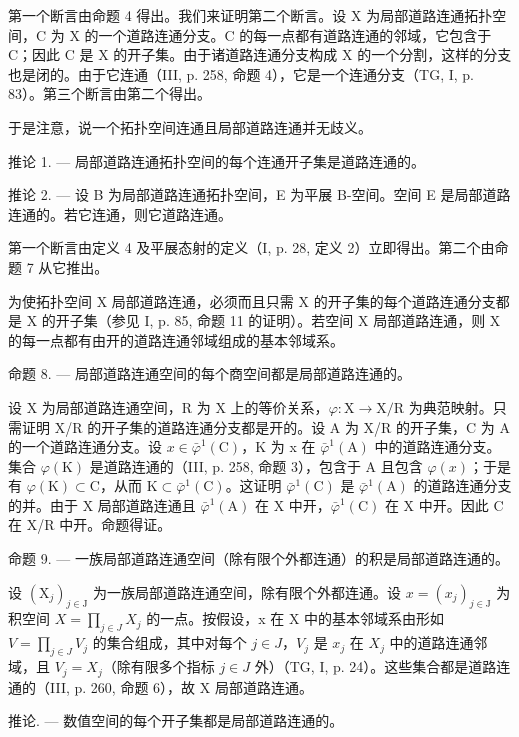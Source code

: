 第一个断言由命题 4 得出。我们来证明第二个断言。设 X 为局部道路连通拓扑空间，C 为 X 的一个道路连通分支。C 的每一点都有道路连通的邻域，它包含于 C；因此 C 是 X 的开子集。由于诸道路连通分支构成 X 的一个分割，这样的分支也是闭的。由于它连通（III, p. 258, 命题 4），它是一个连通分支（TG, I, p. 83）。第三个断言由第二个得出。

于是注意，说一个拓扑空间连通且局部道路连通并无歧义。

推论 1. --- 局部道路连通拓扑空间的每个连通开子集是道路连通的。

推论 2. --- 设 B 为局部道路连通拓扑空间，E 为平展 B-空间。空间 E 是局部道路连通的。若它连通，则它道路连通。

第一个断言由定义 4 及平展态射的定义（I, p. 28, 定义 2）立即得出。第二个由命题 7 从它推出。

为使拓扑空间 X 局部道路连通，必须而且只需 X 的开子集的每个道路连通分支都是 X 的开子集（参见 I, p. 85, 命题 11 的证明）。若空间 X 局部道路连通，则 X 的每一点都有由开的道路连通邻域组成的基本邻域系。

命题 8. --- 局部道路连通空间的每个商空间都是局部道路连通的。

设 X 为局部道路连通空间，R 为 X 上的等价关系，\(\varphi\colon\mathrm{X}\to\mathrm{X}/\mathrm{R}\) 为典范映射。只需证明 X/R 的开子集的道路连通分支都是开的。设 A 为 X/R 的开子集，C 为 A 的一个道路连通分支。设 \(x\in\bar{\varphi}^{1}(\mathrm{C})\)，K 为 x 在 \(\bar{\varphi}^{1}(\mathrm{A})\) 中的道路连通分支。集合 \(\varphi(\mathrm{K})\) 是道路连通的（III, p. 258, 命题 3），包含于 A 且包含 \(\varphi(x)\)；于是有 \(\varphi(\mathrm{K})\subset\mathrm{C}\)，从而 \(\mathrm{K}\subset\bar{\varphi}^{1}(\mathrm{C})\)。这证明 \(\bar{\varphi}^{1}(\mathrm{C})\) 是 \(\bar{\varphi}^{1}(\mathrm{A})\) 的道路连通分支的并。由于 X 局部道路连通且 \(\bar{\varphi}^{1}(\mathrm{A})\) 在 X 中开，\(\bar{\varphi}^{1}(\mathrm{C})\) 在 X 中开。因此 C 在 X/R 中开。命题得证。

命题 9. --- 一族局部道路连通空间（除有限个外都连通）的积是局部道路连通的。

设 \((\mathrm{X}_{j})_{j\in\mathrm{J}}\) 为一族局部道路连通空间，除有限个外都连通。设 \(x=(x_{j})_{j\in\mathrm{J}}\) 为积空间 \(X=\prod_{j\in J}X_{j}\) 的一点。按假设，x 在 X 中的基本邻域系由形如 \(V=\prod_{j\in J}V_{j}\) 的集合组成，其中对每个 \(j\in J\)，\(V_{j}\) 是 \(x_{j}\) 在 \(X_{j}\) 中的道路连通邻域，且 \(V_{j}=X_{j}\)（除有限多个指标 \(j\in J\) 外）（TG, I, p. 24）。这些集合都是道路连通的（III, p. 260, 命题 6），故 X 局部道路连通。

推论. --- 数值空间的每个开子集都是局部道路连通的。

